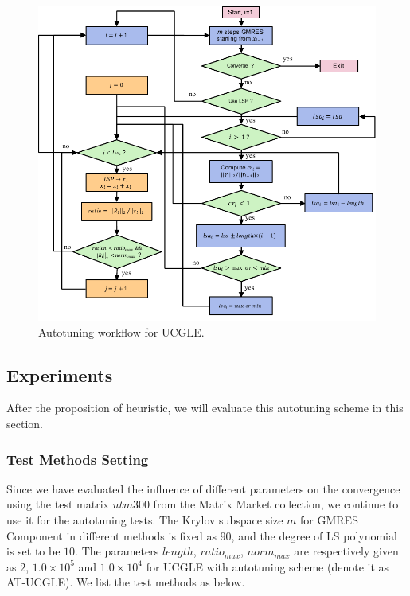\begin{figure}[t]
	\centering
	\includegraphics[width=0.99\linewidth]{fig/autotuning-workflow.pdf}
	\caption{Autotuning workflow for UCGLE.}
	\label{fig:autoworkflow}
\end{figure}

\subsection{Experiments}

After the proposition of heuristic, we will evaluate this autotuning scheme in this section.

\subsubsection{Test Methods Setting}

Since we have evaluated the influence of different parameters on the convergence using the test matrix $utm300$ from the Matrix Market collection, we continue to use it for the autotuning tests. The Krylov subspace size $m$ for GMRES Component in different methods is fixed as $90$, and the degree of LS polynomial is set to be $10$. The parameters $length$, $ratio_{max}$, $norm_{max}$ are respectively given as $2$, $1.0\times10^{5}$ and $1.0\times10^{4}$ for UCGLE with autotuning scheme (denote it as AT-UCGLE). We list the test methods as below.

